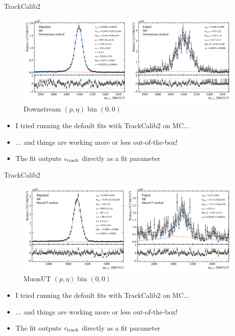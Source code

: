 \documentclass[xcolor={dvipsnames}]{beamer}
\begin{document}
\begin{frame}{TrackCalib2}
  \vspace{0.0cm}
  \begin{figure}[htb]
    \centering
    \includegraphics[width=1.0\textwidth]{Plots/MC_Downstream_P_bin_0_ETA_bin_0_sim.pdf}
    \caption*{\small Downstream $(p, \eta)$ bin $(0, 0)$}
  \end{figure}
  \vspace{-0.5cm}
  \begin{itemize}
    \item{I tried running the default fits with TrackCalib2 on MC...}
    \item{... and things are working more or less out-of-the-box!}
    \item{The fit outputs $\epsilon_{\rm track}$ directly as a fit parameter}
  \end{itemize}
\end{frame}

\begin{frame}{TrackCalib2}
  \vspace{0.0cm}
  \begin{figure}[htb]
    \centering
    \includegraphics[width=1.0\textwidth]{Plots/MC_MuonUT_P_bin_0_ETA_bin_0_sim.pdf}
    \caption*{\small MuonUT $(p, \eta)$ bin $(0, 0)$}
  \end{figure}
  \vspace{-0.5cm}
  \begin{itemize}
    \item{I tried running the default fits with TrackCalib2 on MC...}
    \item{... and things are working more or less out-of-the-box!}
    \item{The fit outputs $\epsilon_{\rm track}$ directly as a fit parameter}
  \end{itemize}
\end{frame}
\end{document}

